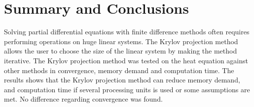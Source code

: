 \section*{Summary and Conclusions}
Solving partial differential equations with finite difference methods often requires performing operations on huge linear systems. The Krylov projection method allows the user to choose the size of the linear system by making the method iterative. The Krylov projection method was tested on the heat equation against other methods in convergence, memory demand and computation time. The results shows that the Krylov projection method can reduce memory demand, and computation time if several processing units is used or some assumptions are met. No difference regarding convergence was found.